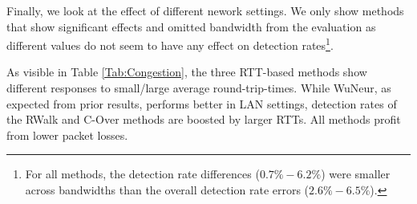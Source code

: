\documentclass[runningheads,11pt]{llncs}\usepackage[]{graphicx}\usepackage[]{color}
\begin{document}
Finally, we look at the effect of different nework settings. We only show methods that show significant effects and omitted bandwidth from the evaluation as different values do not seem to have any effect on detection rates\footnote{For all methods, the detection rate differences ($0.7\%-6.2\%$) were smaller across bandwidths than the overall detection rate errors ($2.6\%-6.5\%$).}.

As visible in Table \ref{Tab:Congestion}, the three RTT-based methods show different responses to small/large average round-trip-times. While WuNeur, as expected from prior results, performs better in LAN settings, detection rates of the RWalk and C-Over methods are boosted by larger RTTs. All methods profit from lower packet losses.


 
\end{document}
